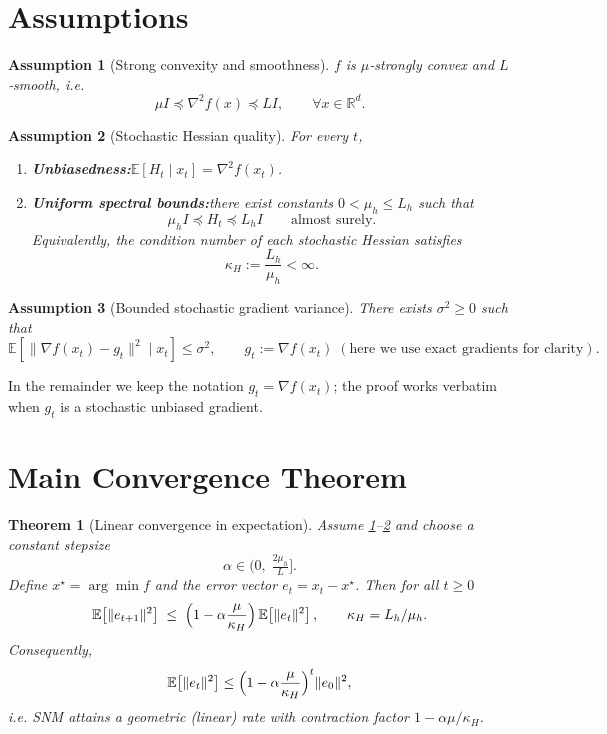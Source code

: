 \documentclass{article}
\newtheorem{theorem}{Theorem}
\newtheorem{assumption}{Assumption}
\newcommand{\E}{\mathbb{E}}
\newcommand{\R}{\mathbb{R}}
\begin{document}
\newpage

\section*{Assumptions}
\begin{assumption}[Strong convexity and smoothness]\label{as:sc}
$f$ is $\mu$‑strongly convex and $L$‑smooth, i.e.
\[
\mu I \preceq \nabla^{2}f(x) \preceq L I,\qquad\forall x\in\R^{d}.
\]
\end{assumption}
\begin{assumption}[Stochastic Hessian quality]\label{as:hessian}
For every $t$,
\begin{enumerate}
\item \textbf{Unbiasedness:}\quad $\displaystyle \E[H_{t}\mid x_{t}]=\nabla^{2}f(x_{t})$.
\item \textbf{Uniform spectral bounds:}\quad there exist constants $0<\mu_{h}\le L_{h}$ such that
\[
\mu_{h} I \preceq H_{t} \preceq L_{h} I\qquad\text{almost surely}.
\]
Equivalently, the condition number of each stochastic Hessian satisfies
\[
\kappa_{H}:=\frac{L_{h}}{\mu_{h}}<\infty .
\]
\end{enumerate}
\end{assumption}
\begin{assumption}[Bounded stochastic gradient variance]\label{as:grad}
There exists $\sigma^{2}\ge0$ such that
\[
\E\!\left[\| \nabla f(x_{t})-g_{t}\|^{2}\mid x_{t}\right]\le\sigma^{2},
\qquad g_{t}:=\nabla f(x_{t})\;( \text{here we use exact gradients for clarity} ).
\]
\end{assumption}
\noindent In the remainder we keep the notation $g_{t}=\nabla f(x_{t})$; the proof works verbatim when $g_{t}$ is a stochastic unbiased gradient.

\section*{Main Convergence Theorem}
\begin{theorem}[Linear convergence in expectation]\label{thm:linear}
Assume \ref{as:sc}--\ref{as:hessian} and choose a constant stepsize
\[
\alpha\in\bigl(0,\; \tfrac{2\mu_{h}}{L}\bigr].
\]
Define $x^{\star}=\arg\min f$ and the error vector $e_{t}=x_{t}-x^{\star}$. Then for all $t\ge0$
\begin{equation}\label{eq:linear}
\E\!\left[\|e_{t+1}\|^{2}\right]\;\le\;
\Bigl(1-\alpha\frac{\mu}{\kappa_{H}}\Bigr)\,\E\!\left[\|e_{t}\|^{2}\right],
\qquad\kappa_{H}=L_{h}/\mu_{h}.
\end{equation}
Consequently,
\[
\E\!\left[\|e_{t}\|^{2}\right]\le
\Bigl(1-\alpha\frac{\mu}{\kappa_{H}}\Bigr)^{t}\|e_{0}\|^{2},
\]
i.e. SNM attains a geometric (linear) rate with contraction factor $1-\alpha\mu/\kappa_{H}$.
\end{theorem}
\end{document}
